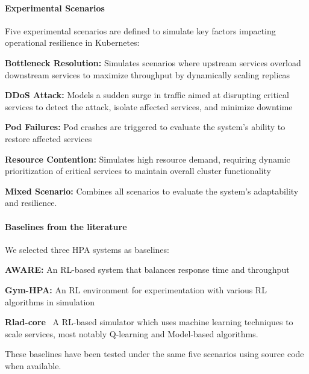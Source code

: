 \paragraph{\textbf{Experimental Scenarios}}

\noindent Five experimental scenarios are defined to simulate key factors impacting operational resilience in Kubernetes:
%
\begin{enumerate*}[label=\textbf{\arabic*)}, itemjoin={;\quad }]
  \item \textbf{Bottleneck Resolution:} Simulates scenarios where upstream services overload downstream services to maximize throughput by dynamically scaling replicas
  \item \textbf{DDoS Attack:} Models a sudden surge in traffic aimed at disrupting critical services to detect the attack, isolate affected services, and minimize downtime~\cite{Liu2018}
  \item \textbf{Pod Failures:} Pod crashes are triggered to evaluate the system's ability to restore affected services~\cite{burns2016borg}
  \item \textbf{Resource Contention:} Simulates high resource demand, requiring dynamic prioritization of critical services to maintain overall cluster functionality~\cite{Vhatkar2022}
  \item \textbf{Mixed Scenario:} Combines all scenarios to evaluate the system's adaptability and resilience.
\end{enumerate*}

\paragraph{\textbf{Baselines from the literature}}
%
\noindent We selected three HPA systems as baselines:
\begin{enumerate*}[label=\textbf{\arabic*)}, itemjoin={;\quad }]
  \item \textbf{AWARE:} An RL-based system that balances response time and throughput~\cite{aware2023}
  \item \textbf{Gym-HPA:} An RL environment for experimentation with various RL algorithms in simulation~\cite{gymhpa2022}
  \item \textbf{Rlad-core}~\cite{Rossi2019} A RL-based simulator which uses machine learning techniques to scale services, most notably Q-learning and Model-based algorithms.
\end{enumerate*}

These baselines have been tested under the same five scenarios using source code when available.

